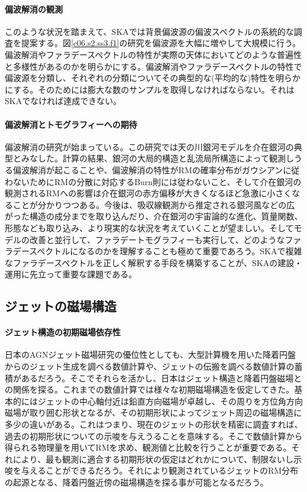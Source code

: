 \paragraph{偏波解消の観測}

このような状況を踏まえて、SKAでは背景偏波源の偏波スペクトルの系統的な調査を提案する。図\ref{c06.s2.ss3.f1}の研究\citep{2014ApJS..212...15F}を偏波源を大幅に増やして大規模に行う。偏波解消やファラデースペクトルの特性が実際の天体においてどのような普遍性と多様性があるのかを明らかにする。偏波解消やファラデースペクトルの特性で偏波源を分類し、それぞれの分類についてその典型的な(平均的な)特性を明らかにする。そのためには膨大な数のサンプルを取得しなければならない。それはSKAでなければ達成できない。

\paragraph{偏波解消とトモグラフィーへの期待}

偏波解消の研究が始まっている。この研究では天の川銀河モデルを介在銀河の典型とみなした。計算の結果、銀河の大局的構造と乱流局所構造によって観測しうる偏波解消が起こることや、偏波解消の特性がRMの確率分布がガウシアンに従わないためにRMの分散に対応するBurn則には従わないこと、そして介在銀河の観測されるRMへの影響は介在銀河の赤方偏移が大きくなるほど急激に小さくなることが分かりつつある。今後は、吸収線観測から推定される銀河風などの広がった構造の成分までを取り込んだり、介在銀河の宇宙論的な進化、質量関数、形態なども取り込み、より現実的な状況を考えていくことが望ましい。そしてモデルの改善と並行して、ファラデートモグラフィーも実行して、どのようなファラデースペクトルになるのかを理解することも極めて重要であろう。SKAで複雑なファラデースペクトルを正しく解釈する手段を構築することが、SKAの建設・運用に先立って重要な課題である。


\subsection{ジェットの磁場構造}
\label{c06.s3.ss5}

\paragraph{ジェット構造の初期磁場依存性}

日本のAGNジェット磁場研究の優位性としても、大型計算機を用いた降着円盤からのジェット生成を調べる数値計算や、ジェットの伝搬を調べる数値計算の蓄積があるだろう。そこでそれらを活かし、日本はジェット構造と降着円盤磁場との関係を探る。これまでの数値計算では様々な初期磁場構造を仮定してきた。基本的にはジェットの中心軸付近は鉛直方向磁場が卓越し、その周りを方位角方向磁場が取り囲む形状となるが、その初期形状によってジェット周辺の磁場構造に多少の違いがある。これはつまり、現在のジェットの形状を精密に調査すれば、過去の初期形状についての示唆を与えうることを意味する。そこで数値計算から得られる物理量を用いてRMを求め、観測値と比較を行うことが重要である。それにより、最も観測に適合する初期形状の仮定はどれかについて、制限ないし示唆を与えることができるだろう。それにより観測されているジェットのRM分布の起源となる、降着円盤近傍の磁場構造を探る事が可能となるだろう。


